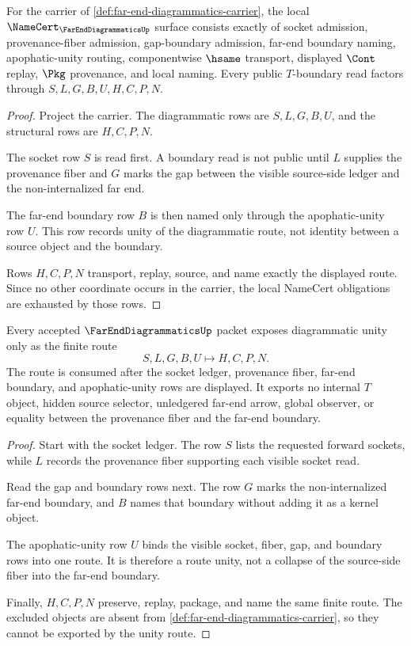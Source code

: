 \begin{theorem}\label{thm:far-end-diagrammatics-namecert-obligations}
For the carrier of \autoref{def:far-end-diagrammatics-carrier}, the local $\NameCert_{\FarEndDiagrammaticsUp}$ surface consists exactly of socket admission, provenance-fiber admission, gap-boundary admission, far-end boundary naming, apophatic-unity routing, componentwise $\hsame$ transport, displayed $\Cont$ replay, $\Pkg$ provenance, and local naming. Every public $T$-boundary read factors through $S,L,G,B,U,H,C,P,N$.
\end{theorem}
\begin{proof}
Project the carrier. The diagrammatic rows are $S,L,G,B,U$, and the structural rows are $H,C,P,N$.

The socket row $S$ is read first. A boundary read is not public until $L$ supplies the provenance fiber and $G$ marks the gap between the visible source-side ledger and the non-internalized far end.

The far-end boundary row $B$ is then named only through the apophatic-unity row $U$. This row records unity of the diagrammatic route, not identity between a source object and the boundary.

Rows $H,C,P,N$ transport, replay, source, and name exactly the displayed route. Since no other coordinate occurs in the carrier, the local NameCert obligations are exhausted by those rows.
\end{proof}

\begin{theorem}\label{thm:far-end-diagrammatics-unity-route}
Every accepted $\FarEndDiagrammaticsUp$ packet exposes diagrammatic unity only as the finite route
$$
S,L,G,B,U \longmapsto H,C,P,N .
$$
The route is consumed after the socket ledger, provenance fiber, far-end boundary, and apophatic-unity rows are displayed. It exports no internal $T$ object, hidden source selector, unledgered far-end arrow, global observer, or equality between the provenance fiber and the far-end boundary.
\end{theorem}
\begin{proof}
Start with the socket ledger. The row $S$ lists the requested forward sockets, while $L$ records the provenance fiber supporting each visible socket read.

Read the gap and boundary rows next. The row $G$ marks the non-internalized far-end boundary, and $B$ names that boundary without adding it as a kernel object.

The apophatic-unity row $U$ binds the visible socket, fiber, gap, and boundary rows into one route. It is therefore a route unity, not a collapse of the source-side fiber into the far-end boundary.

Finally, $H,C,P,N$ preserve, replay, package, and name the same finite route. The excluded objects are absent from \autoref{def:far-end-diagrammatics-carrier}, so they cannot be exported by the unity route.
\end{proof}


